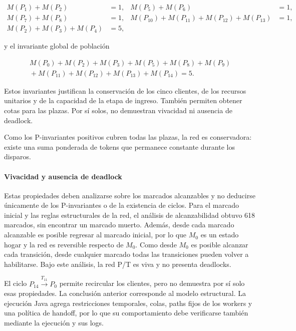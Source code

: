 \documentclass[11pt,a4paper]{article}
\begin{document}
\begin{align*}
    M(P_1)+M(P_2)&=1, & M(P_5)+M(P_6)&=1,\\
    M(P_7)+M(P_8)&=1, & M(P_{10})+M(P_{11})+M(P_{12})+M(P_{13})&=1,\\
    M(P_2)+M(P_3)+M(P_4)&=5,
\end{align*}

y el invariante global de población

\begin{equation}
\begin{split}
    M(P_0)+M(P_2)+M(P_3)+M(P_5)+M(P_8)+M(P_9)\\
    {}+M(P_{11})+M(P_{12})+M(P_{13})+M(P_{14})=5.
\end{split}
\end{equation}

Estos invariantes justifican la conservación de los cinco clientes, de los
recursos unitarios y de la capacidad de la etapa de ingreso. También permiten
obtener cotas para las plazas. Por sí solos, no demuestran vivacidad ni
ausencia de deadlock.

Como los P-invariantes positivos cubren todas las plazas, la red es
conservadora: existe una suma ponderada de tokens que permanece constante
durante los disparos.

\paragraph{Vivacidad y ausencia de deadlock}

Estas propiedades deben analizarse sobre los marcados alcanzables y no
deducirse únicamente de los P-invariantes o de la existencia de ciclos. Para
el marcado inicial y las reglas estructurales de la red, el análisis de
alcanzabilidad obtuvo 618 marcados, sin encontrar un marcado muerto. Además,
desde cada marcado alcanzable es posible regresar al marcado inicial, por lo
que $M_0$ es un estado hogar y la red es reversible respecto de $M_0$. Como
desde $M_0$ es posible alcanzar cada transición, desde cualquier marcado todas
las transiciones pueden volver a habilitarse. Bajo este análisis, la red P/T es
viva y no presenta deadlocks.

El ciclo $P_{14}\xrightarrow{T_{11}}P_0$ permite recircular los clientes, pero
no demuestra por sí solo esas propiedades. La conclusión anterior corresponde
al modelo estructural. La ejecución Java agrega restricciones temporales,
colas, paths fijos de los workers y una política de handoff, por lo que su
comportamiento debe verificarse también mediante la ejecución y sus logs.
\end{document}
